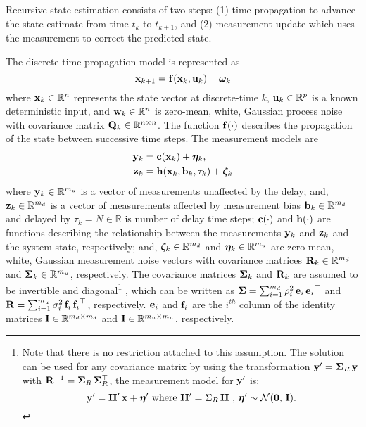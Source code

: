 Recursive state estimation consists of two steps:
(1) time propagation to advance the state estimate from time $t_k$ to $t_{k+1}$, and
(2) measurement update which uses the measurement to correct the predicted state.

The discrete-time propagation model is represented as
\begin{equation}
	\label{eqn:StateProp}
	\mathbf{x}_{k+1} = \mathbf{f} (\mathbf{x}_k, \mathbf{u}_k ) + \boldsymbol{\omega}_k
\end{equation}
where 
$\mathbf{x}_k \in\mathbb{R}^n$ represents the state vector at discrete-time $k$,
$\mathbf{u}_k \in \mathbb{R}^p$ is a known deterministic input, and 
$\mathbf{w}_k \in \mathbb{R}^n$ is zero-mean, white, Gaussian process noise with covariance matrix $\mathbf{Q}_k \in \mathbb{R}^{n \times n}$. 
The function $\mathbf{f} (\cdot)$ describes the propagation of the state between successive time steps.
The measurement models are
\begin{align} 
	\label{eqn:UndelayedMeasurement}
	\mathbf{y}_k &= \mathbf{c} ( \mathbf{x}_k ) + \boldsymbol{\eta}_k, \\
	\label{eqn:DelayedMeasurement}
	\mathbf{z}_k &= \mathbf{h} ( \mathbf{x}_{k}, \mathbf{b}_{k}, \tau_k ) + \boldsymbol{\zeta}_k
\end{align}
where 
$\mathbf{y}_k \in \mathbb{R}^{m_u}$ is a vector of measurements unaffected by the delay;
and, 
$\mathbf{z}_k \in \mathbb{R}^{m_d}$ is a vector of measurements affected by measurement bias $\mathbf{b}_k \in \mathbb{R}^{m_d}$  and delayed by \red $\tau_k = N \in \mathbb{R}$ is number of delay time steps; \black
$\mathbf{c}(\cdot)$ and $\mathbf{h}(\cdot)$ are functions describing the relationship between the measurements $\mathbf{y}_k$ and $\mathbf{z}_k$ and the system state, respectively; and,
$\boldsymbol{\zeta}_k \in \mathbb{R}^{m_d}$ and $\boldsymbol{\eta}_k \in \mathbb{R}^{m_u}$ are zero-mean, white, Gaussian measurement noise vectors with covariance matrices $\mathbf{R}_k \in \mathbb{R}^{m_d}$ and $\boldsymbol{\Sigma}_k \in \mathbb{R}^{m_u}$, respectively.
The covariance matrices $\boldsymbol{\Sigma}_k$ and $\mathbf{R}_k$ are assumed to be invertible and diagonal\footnote
{\label{ftnt:R_assumption}
	Note that there is no restriction attached to this assumption. The solution can be used for any  covariance matrix by using the transformation $\mathbf{y}' =\boldsymbol{\Sigma}_R  \, \mathbf{y}$ with $\mathbf{R}^{-1} = \boldsymbol{\Sigma}_R \, \boldsymbol{\Sigma}_R^\top$, the measurement model for $\mathbf{y}'$ is:
	$$\mathbf{y}'=\mathbf{H}' \,\mathbf{x}+\boldsymbol{\eta}' \mbox{ where } \mathbf{H}' = \Sigma_R  \, \mathbf{H} \mbox{ , } \boldsymbol{\eta}' \sim \mathcal{N}(\boldsymbol{0},\,\mathbf{I}).$$
}
, which can be written as $\boldsymbol{\Sigma} = \sum_{i=1}^{m_d} \rho_{i}^2 \, \mathbf{e}_i  \,{\mathbf{e}_i}^\top$ and $\mathbf{R} = \sum_{i=1}^{m_u} \sigma_{i}^2 \, \mathbf{f}_i  \,{\mathbf{f}_i}^\top$, respectively. $\mathbf{e}_i$ and $\mathbf{f}_i$ are the $i^{th}$ column of the identity matrices $\mathbf{I} \in \mathbb{R}^{m_d \times m_d}$ and $\mathbf{I} \in \mathbb{R}^{m_u \times m_u}$, respectively.

